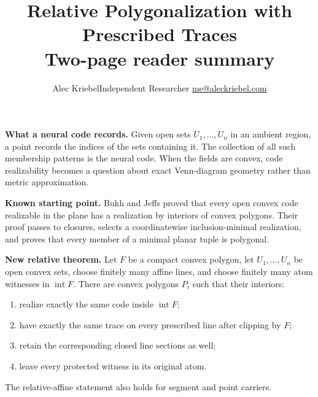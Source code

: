 \documentclass[10pt]{article}
\title{\vspace{-2em}\bfseries Relative Polygonalization with Prescribed Traces\\[-.2em]
\large Two-page reader summary}
\author{Alec Kriebel\quad\textbar\quad Independent Researcher\quad\textbar\quad
\href{mailto:me@aleckriebel.com}{me@aleckriebel.com}}
\date{}
\begin{document}
\maketitle
\vspace{-2em}

\textbf{What a neural code records.}
Given open sets $U_1,\ldots,U_n$ in an ambient region, a point records the
indices of the sets containing it.  The collection of all such membership
patterns is the neural code.  When the fields are convex, code realizability
becomes a question about exact Venn-diagram geometry rather than metric
approximation.

\textbf{Known starting point.}
Bukh and Jeffs proved that every open convex code realizable in the plane has
a realization by interiors of convex polygons.  Their proof passes to
closures, selects a coordinatewise inclusion-minimal realization, and proves
that every member of a minimal planar tuple is polygonal.

\textbf{New relative theorem.}
Let $F$ be a compact convex polygon, let $U_1,\ldots,U_n$ be open convex
sets, choose finitely many affine lines, and choose finitely many atom
witnesses in $\operatorname{int}F$.  There are convex polygons $P_i$ such
that their interiors:
\begin{enumerate}
\item realize exactly the same code inside $\operatorname{int}F$;
\item have exactly the same trace on every prescribed line after clipping by
      $F$;
\item retain the corresponding closed line sections as well;
\item leave every protected witness in its original atom.
\end{enumerate}
The relative-affine statement also holds for segment and point carriers.

\begin{center}
\end{center}
\end{document}
